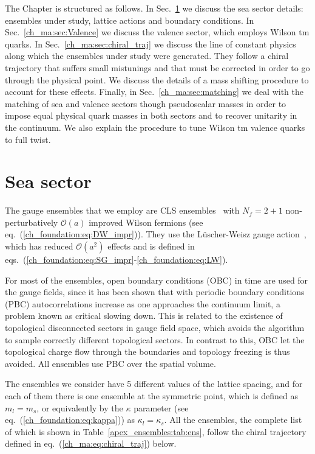 The Chapter is structured as follows. In Sec.~\ref{ch_ma:sec:Sea} we discuss the sea sector details: ensembles under study, lattice actions and boundary conditions. In Sec.~\ref{ch_ma:sec:Valence} we discuss the valence sector, which employs Wilson tm quarks. In Sec.~\ref{ch_ma:sec:chiral_traj} we discuss the line of constant physics along which the ensembles under study were generated. They follow a chiral trajectory that suffers small mistunings and that must be corrected in order to go through the physical point. We discuss the details of a mass shifting procedure to account for these effects. Finally, in Sec.~\ref{ch_ma:sec:matching} we deal with the matching of sea and valence sectors though pseudoscalar masses in order to impose equal physical quark masses in both sectors and to recover unitarity in the continuum. We also explain the procedure to tune Wilson tm valence quarks to full twist.


\section{Sea sector}
\label{ch_ma:sec:Sea}

The gauge ensembles that we employ are CLS ensembles~\citep{Bruno:2014jqa,Mohler:2017wnb} with $N_f=2+1$ non-perturbatively $\mathcal{O}(a)$ improved Wilson fermions (see eq.~(\ref{ch_foundation:eq:DW_impr})). They use the Lüscher-Weisz gauge action~\citep{Luscher:1985zq}, which has reduced $\mathcal{O}(a^2)$ effects and is defined in eqs.~(\ref{ch_foundation:eq:SG_impr}-\ref{ch_foundation:eq:LW}).

For most of the ensembles, open boundary conditions (OBC) in time are used for the gauge fields, since it has been shown that with periodic boundary conditions (PBC) autocorrelations increase as one approaches the continuum limit, a problem known as critical slowing down. This is related to the existence of topological disconnected sectors in gauge field space, which avoids the algorithm to sample correctly different topological sectors. In contrast to this, OBC let the topological charge flow through the boundaries and topology freezing is thus avoided. All ensembles use PBC over the spatial volume.

The ensembles we consider have 5 different values of the lattice spacing, and for each of them there is one ensemble at the symmetric point, which is defined as $m_l=m_s$, or equivalently by the $\kappa$ parameter (see eq.~(\ref{ch_foundation:eq:kappa})) as $\kappa_l=\kappa_s$. All the ensembles, the complete list of which is shown in Table~\ref{apex_ensembles:tab:ens}, follow the chiral trajectory defined in eq.~(\ref{ch_ma:eq:chiral_traj}) below.


